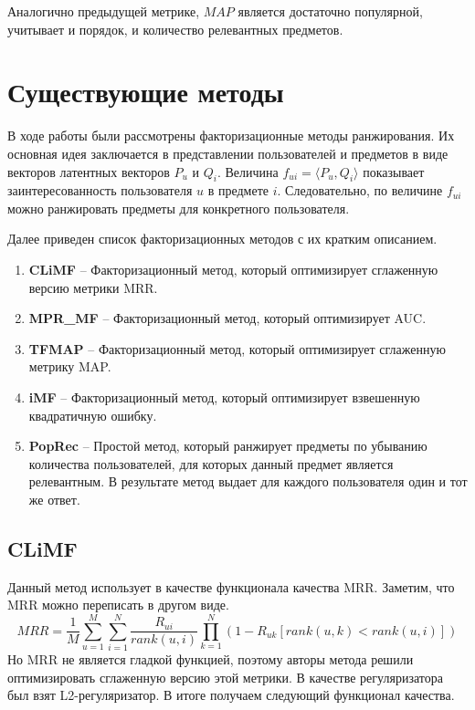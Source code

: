 \documentclass[14pt]{extarticle}
\begin{document}
	Аналогично предыдущей метрике, $MAP$ является достаточно популярной, учитывает и порядок, и количество релевантных предметов.
	
	

\section{Существующие методы}
В ходе работы были рассмотрены факторизационные методы ранжирования. Их основная идея заключается в представлении пользователей и предметов в виде векторов латентных векторов $P_u$ и $Q_i$. Величина $f_{ui} = \langle P_u, Q_i\rangle$  показывает заинтересованность пользователя $u$ в предмете  $i$. Следовательно, по величине $f_{ui}$ можно ранжировать предметы для конкретного пользователя.
	
Далее приведен список факторизационных методов с их кратким описанием.  
\begin{enumerate}
\item \textbf{CLiMF} --
  Факторизационный метод, который оптимизирует сглаженную версию метрики MRR.\cite{climf}
  	
\item \textbf{MPR\_MF} -- 
  Факторизационный метод, который оптимизирует AUC.\cite{bprmp}
  
\item \textbf{TFMAP} --
   Факторизационный метод, который оптимизирует сглаженную метрику MAP.\cite{tfmap}

\item \textbf{iMF} --
	Факторизационный метод, который оптимизирует взвешенную квадратичную ошибку.\cite{imf} 

\item \textbf{PopRec} --
    Простой метод, который ранжирует предметы по убыванию количества пользователей, для которых данный предмет является релевантным. В результате метод выдает для каждого пользователя один  и тот же ответ.
\end{enumerate}

\subsection{CLiMF}
Данный метод использует в качестве функционала качества MRR. Заметим, что MRR можно переписать в другом виде.
\begin{equation*}
 MRR =\frac{1}{M}\sum_{u=1}^M \sum_{i=1}^N \frac{R_{ui}}{rank(u,i)}\prod_{k=1}^N(1 - R_{uk}[rank(u,k) < rank(u, i)])
\end{equation*}
 Но  MRR не является гладкой функцией, поэтому авторы метода решили оптимизировать сглаженную версию этой метрики. В качестве регуляризатора был взят L2-регуляризатор. В итоге получаем следующий функционал качества.
\end{document}
